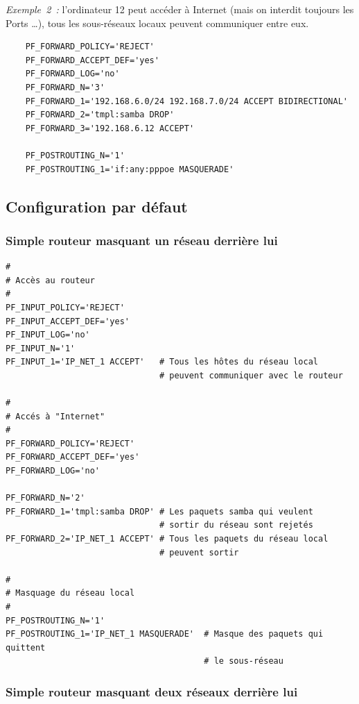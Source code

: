 \emph{Exemple~2~:} l'ordinateur 12 peut accéder à Internet (mais on interdit
toujours les Ports \ldots), tous les sous-réseaux locaux peuvent communiquer
entre eux.

\begin{example}
\begin{verbatim}
    PF_FORWARD_POLICY='REJECT'
    PF_FORWARD_ACCEPT_DEF='yes'
    PF_FORWARD_LOG='no'
    PF_FORWARD_N='3'
    PF_FORWARD_1='192.168.6.0/24 192.168.7.0/24 ACCEPT BIDIRECTIONAL'
    PF_FORWARD_2='tmpl:samba DROP'
    PF_FORWARD_3='192.168.6.12 ACCEPT'

    PF_POSTROUTING_N='1'
    PF_POSTROUTING_1='if:any:pppoe MASQUERADE'
\end{verbatim}
\end{example}

\subsection{Configuration par défaut}

\subsubsection{Simple routeur masquant un réseau derrière lui}

\begin{example}
\begin{verbatim}
#
# Accès au routeur
#
PF_INPUT_POLICY='REJECT'
PF_INPUT_ACCEPT_DEF='yes'
PF_INPUT_LOG='no'
PF_INPUT_N='1'
PF_INPUT_1='IP_NET_1 ACCEPT'   # Tous les hôtes du réseau local
                               # peuvent communiquer avec le routeur

#
# Accés à "Internet"
#
PF_FORWARD_POLICY='REJECT'
PF_FORWARD_ACCEPT_DEF='yes'
PF_FORWARD_LOG='no'

PF_FORWARD_N='2'
PF_FORWARD_1='tmpl:samba DROP' # Les paquets samba qui veulent
                               # sortir du réseau sont rejetés
PF_FORWARD_2='IP_NET_1 ACCEPT' # Tous les paquets du réseau local
                               # peuvent sortir

#
# Masquage du réseau local
#
PF_POSTROUTING_N='1'
PF_POSTROUTING_1='IP_NET_1 MASQUERADE'  # Masque des paquets qui quittent
                                        # le sous-réseau
\end{verbatim}
\end{example}

\subsubsection{Simple routeur masquant deux réseaux derrière lui}


